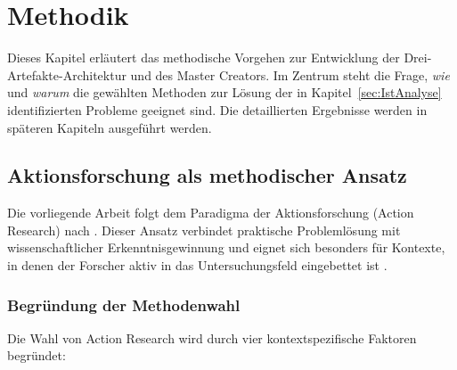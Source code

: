 \section{Methodik}
\label{sec:Methodik}


Dieses Kapitel erläutert das methodische Vorgehen zur Entwicklung der Drei-Artefakte-Architektur und des Master Creators. Im Zentrum steht die Frage, \textit{wie} und \textit{warum} die gewählten Methoden zur Lösung der in Kapitel~\ref{sec:IstAnalyse} identifizierten Probleme geeignet sind. Die detaillierten Ergebnisse werden in späteren Kapiteln ausgeführt werden.


\subsection{Aktionsforschung als methodischer Ansatz}
\label{subsec:Aktionsforschung}

Die vorliegende Arbeit folgt dem Paradigma der Aktionsforschung (Action Research) nach \cite{lewin:action_research1946}. Dieser Ansatz verbindet praktische Problemlösung mit wissenschaftlicher Erkenntnisgewinnung und eignet sich besonders für Kontexte, in denen der Forscher aktiv in das Untersuchungsfeld eingebettet ist \citep{reason:handbook_action_research2001}.

\subsubsection{Begründung der Methodenwahl}
\label{subsubsec:BegruendungMethode}

Die Wahl von Action Research wird durch vier kontextspezifische Faktoren begründet:

